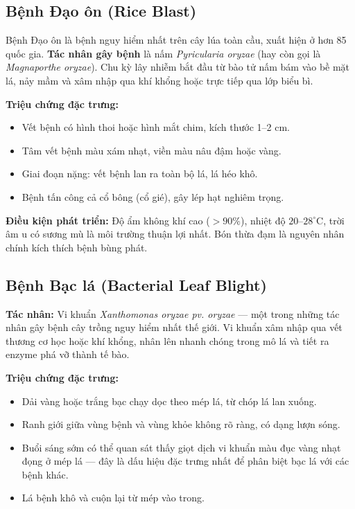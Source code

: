 \documentclass[13pt,a4paper]{extreport}
\begin{document}
\subsection{Bệnh Đạo ôn (Rice Blast)}
Bệnh Đạo ôn là bệnh nguy hiểm nhất trên cây lúa toàn cầu, xuất hiện ở hơn 85 quốc gia. \textbf{Tác nhân gây bệnh} là nấm \textit{Pyricularia oryzae} (hay còn gọi là \textit{Magnaporthe oryzae}). Chu kỳ lây nhiễm bắt đầu từ bào tử nấm bám vào bề mặt lá, nảy mầm và xâm nhập qua khí khổng hoặc trực tiếp qua lớp biểu bì.

\textbf{Triệu chứng đặc trưng:}
\begin{itemize}[leftmargin=1.5cm]
    \item Vết bệnh có hình thoi hoặc hình mắt chim, kích thước 1--2 cm.
    \item Tâm vết bệnh màu xám nhạt, viền màu nâu đậm hoặc vàng.
    \item Giai đoạn nặng: vết bệnh lan ra toàn bộ lá, lá héo khô.
    \item Bệnh tấn công cả cổ bông (cổ gié), gây lép hạt nghiêm trọng.
\end{itemize}

\textbf{Điều kiện phát triển:} Độ ẩm không khí cao ($>90\%$), nhiệt độ $20$--$28^\circ$C, trời âm u có sương mù là môi trường thuận lợi nhất. Bón thừa đạm là nguyên nhân chính kích thích bệnh bùng phát.

\subsection{Bệnh Bạc lá (Bacterial Leaf Blight)}
\textbf{Tác nhân:} Vi khuẩn \textit{Xanthomonas oryzae pv. oryzae} --- một trong những tác nhân gây bệnh cây trồng nguy hiểm nhất thế giới. Vi khuẩn xâm nhập qua vết thương cơ học hoặc khí khổng, nhân lên nhanh chóng trong mô lá và tiết ra enzyme phá vỡ thành tế bào.

\textbf{Triệu chứng đặc trưng:}
\begin{itemize}[leftmargin=1.5cm]
    \item Dải vàng hoặc trắng bạc chạy dọc theo mép lá, từ chóp lá lan xuống.
    \item Ranh giới giữa vùng bệnh và vùng khỏe không rõ ràng, có dạng lượn sóng.
    \item Buổi sáng sớm có thể quan sát thấy giọt dịch vi khuẩn màu đục vàng nhạt đọng ở mép lá --- đây là dấu hiệu đặc trưng nhất để phân biệt bạc lá với các bệnh khác.
    \item Lá bệnh khô và cuộn lại từ mép vào trong.
\end{itemize}
\end{document}
